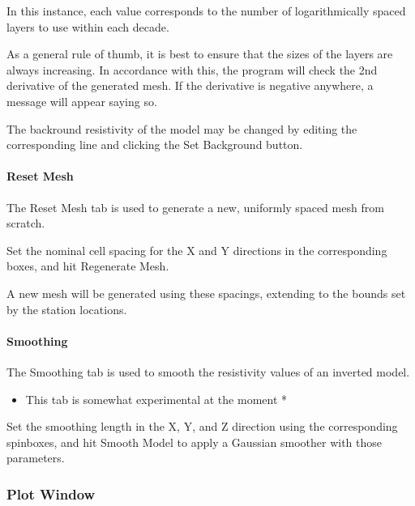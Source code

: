 \documentclass[letterpaper,10pt,english]{sphinxmanual}
\begin{document}
In this instance, each value corresponds to the number of logarithmically spaced layers to use within each decade.

As a general rule of thumb, it is best to ensure that the sizes of the layers are always increasing. In accordance with this, the program will check the 2nd derivative of the generated mesh. If the derivative is negative anywhere, a message will appear saying so.

The backround resistivity of the model may be changed by editing the corresponding line and clicking the Set Background button.


\paragraph{Reset Mesh}
\label{\detokenize{content/mesh_designer/main_window:reset-mesh}}
The Reset Mesh tab is used to generate a new, uniformly spaced mesh from scratch.

Set the nominal cell spacing for the X and Y directions in the corresponding boxes, and hit Regenerate Mesh.

A new mesh will be generated using these spacings, extending to the bounds set by the station locations.


\paragraph{Smoothing}
\label{\detokenize{content/mesh_designer/main_window:smoothing}}
The Smoothing tab is used to smooth the resistivity values of an inverted model.
\begin{itemize}
\item {} 
This tab is somewhat experimental at the moment *

\end{itemize}

Set the smoothing length in the X, Y, and Z direction using the corresponding spinboxes, and hit Smooth Model to apply a Gaussian smoother with those parameters.


\subsubsection{Plot Window}
\label{\detokenize{content/mesh_designer/main_window:plot-window}}
\begin{figure}[htbp]
\centering

\noindent{}
\end{figure}
\end{document}
